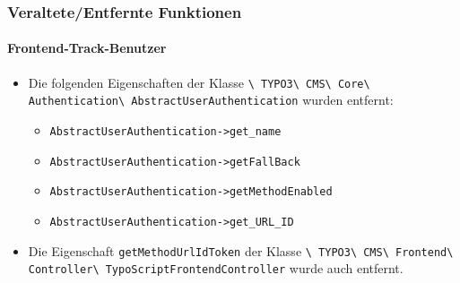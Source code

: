 
\begin{frame}[fragile]
	\frametitle{Veraltete/Entfernte Funktionen}
	\framesubtitle{Frontend-Track-Benutzer}

	\begin{itemize}

		\item Die folgenden Eigenschaften der Klasse \newline
			\smaller\texttt{\textbackslash
				TYPO3\textbackslash
				CMS\textbackslash
				Core\textbackslash
				Authentication\textbackslash
				AbstractUserAuthentication}
			\normalsize\newline
			wurden entfernt:

			\begin{itemize}\smaller
				\item \texttt{AbstractUserAuthentication->get\_name}
				\item \texttt{AbstractUserAuthentication->getFallBack}
				\item \texttt{AbstractUserAuthentication->getMethodEnabled}
				\item \texttt{AbstractUserAuthentication->get\_URL\_ID}
			\end{itemize}\normalsize

		\item Die Eigenschaft \texttt{getMethodUrlIdToken} der Klasse \newline
			\smaller\texttt{\textbackslash
				TYPO3\textbackslash
				CMS\textbackslash
				Frontend\textbackslash
				Controller\textbackslash
				TypoScriptFrontendController}
			wurde auch entfernt.	
			\normalsize
	\end{itemize}

\end{frame}


